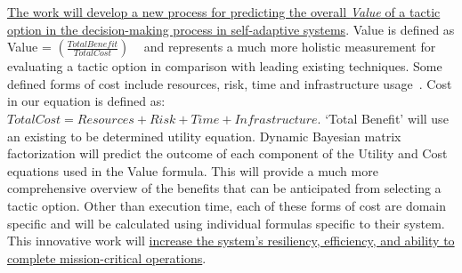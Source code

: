 \documentclass[12pt]{article}
\newcommand{\todo}[1]{\textcolor{cyan}{\textbf{[#1]}}}
\begin{document}
\ul{The work will develop a new process for predicting the overall \emph{Value} of a tactic option in the decision-making process in self-adaptive systems}. Value is defined as Value = $(\frac{Total Benefit}{Total Cost})$ ~\cite{Donckt-Cost} and represents a much more holistic measurement for evaluating a tactic option in comparison with leading existing techniques. Some defined forms of cost include resources, risk, time and infrastructure usage~\cite{Donckt-Cost}. Cost in our equation is defined as: $Total Cost = Resources + Risk + Time + Infrastructure$. `Total Benefit' will use an existing to be determined utility equation. Dynamic Bayesian matrix factorization will predict the outcome of each component of the Utility and Cost equations used in the Value formula. This will provide a much more comprehensive overview of the benefits that can be anticipated from selecting a tactic option. Other than execution time, each of these forms of cost are domain specific and will be calculated using individual formulas specific to their system. This innovative work will \ul{increase the system's resiliency, efficiency, and ability to complete mission-critical operations}.



\end{document}
